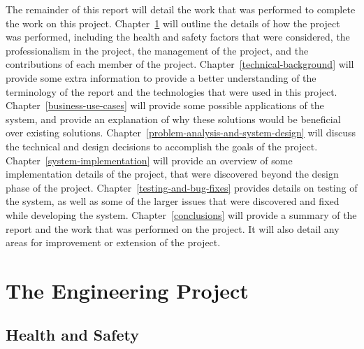 \documentclass[12pt]{report}
\let\Oldsection\section
\renewcommand{\section}{\FloatBarrier\Oldsection}
\begin{document}
The remainder of this report will detail the work that was performed to complete the work on this project.
Chapter~\ref{the-engineering-project} will outline the details of how the project was performed, including
the health and safety factors that were considered, the professionalism in the project, the management of
the project, and the contributions of each member of the project.
Chapter~\ref{technical-background} will provide some extra information to provide a better understanding of
the terminology of the report and the technologies that were used in this project.
Chapter~\ref{business-use-cases} will provide some possible applications of the system, and provide an explanation
of why these solutions would be beneficial over existing solutions.
Chapter~\ref{problem-analysis-and-system-design} will discuss the technical and design decisions to accomplish the
goals of the project.
Chapter~\ref{system-implementation} will provide an overview of some implementation details of the project, that were
discovered beyond the design phase of the project.
Chapter~\ref{testing-and-bug-fixes} provides details on testing of the system, as well as some of the larger issues that
were discovered and fixed while developing the system.
Chapter~\ref{conclusions} will provide a summary of the report and the work that was performed on the project.
It will also detail any areas for improvement or extension of the project.





\chapter{The Engineering Project} \label{the-engineering-project}


\section{Health and Safety} \label{health-and-safety}
\end{document}

